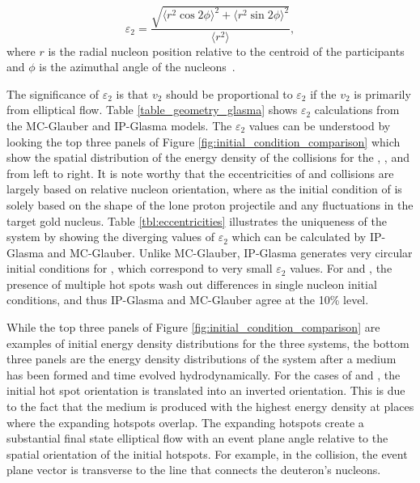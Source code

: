 \begin{equation}
\label{eqn:eccentricity_equation}
\varepsilon_2 = \frac{\sqrt{\langle r^2 \cos2\phi\rangle^2+\langle r^2 \sin2\phi\rangle^2}}{\langle r^2\rangle},
\end{equation}
where $r$ is the radial nucleon position relative to the centroid of the participants and $\phi$ is the azimuthal angle of the nucleons~\cite{PhysRevC.81.054905}. 

The significance of $\varepsilon_2$ is that $v_2$ should be proportional to $\varepsilon_2$ if the $v_2$ is primarily from elliptical flow. Table \ref{table_geometry_glasma} shows $\varepsilon_2$ calculations from the MC-Glauber and IP-Glasma models. The $\varepsilon_2$ values can be understood by looking the top three panels of Figure \ref{fig:initial_condition_comparison} which show the spatial distribution of the energy density of the collisions for the \pau, \dau, and \hau from left to right. It is note worthy that the eccentricities of \dau and \hau collisions are largely based on relative nucleon orientation, where as the initial condition of \pau is solely based on the shape of the lone proton projectile and any fluctuations in the target gold nucleus. Table \ref{tbl:eccentricities} illustrates the uniqueness of the \pau system by showing the diverging values of $\varepsilon_2$ which can be calculated by IP-Glasma and MC-Glauber. Unlike MC-Glauber, IP-Glasma generates very circular initial conditions for \pau, which correspond to very small $\varepsilon_2$ values. For \dau and \hau, the presence of multiple hot spots wash out differences in single nucleon initial conditions, and thus IP-Glasma and MC-Glauber agree at the 10\% level. 

While the top three panels of Figure \ref{fig:initial_condition_comparison} are examples of initial energy density distributions for the three systems, the bottom three panels are the energy density distributions of the system after a medium has been formed and time evolved hydrodynamically. For the cases of \dau and \hau, the initial hot spot orientation is translated into an inverted orientation. This is due to the fact that the medium is produced with the highest energy density at places where the expanding hotspots overlap. The expanding hotspots create a substantial final state elliptical flow with an event plane angle relative to the spatial orientation of the initial hotspots. For example, in the \dau collision, the event plane vector is transverse to the line that connects the deuteron's nucleons. 

